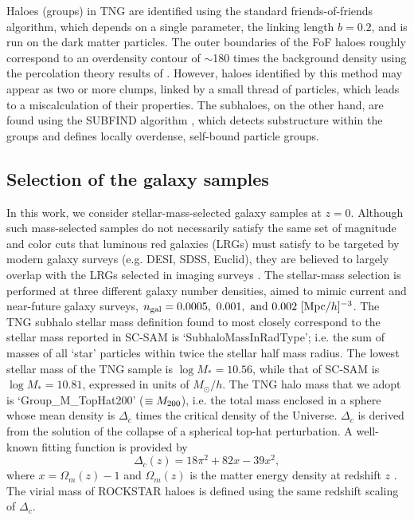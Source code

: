 \documentclass[fleqn,usenatbib]{mnras}
\begin{document}
Haloes (groups) in TNG are identified using the standard friends-of-friends \citep[FoF,][]{1985ApJ...292..371D,1987ApJ...319..575B} algorithm, which depends on a single parameter, the linking length $b = 0.2$, and is run on the dark matter particles. The outer boundaries of the FoF haloes roughly correspond to an overdensity contour of $\sim$180 times the background density using the percolation theory results of \citet{2011ApJS..195....4M}. However, haloes identified by this method may appear as two or more clumps, linked by a small thread of particles, which leads to a miscalculation of their properties. The subhaloes, on the other hand, are found using the SUBFIND algorithm \citep{Springel:2000qu}, which detects substructure within the groups and defines locally overdense, self-bound particle groups.

\subsection{Selection of the galaxy samples}
\label{sec:sample}
In this work, we consider stellar-mass-selected galaxy samples at $z = 0$. Although such mass-selected samples do not necessarily satisfy the same set of magnitude and color cuts that luminous red galaxies (LRGs) must satisfy to be targeted by modern galaxy surveys (e.g. DESI, SDSS, Euclid), they are believed to largely overlap with the LRGs selected in imaging surveys \citep{2013MNRAS.433.3506M}. 
%
The stellar-mass selection is performed at three different galaxy number densities, aimed to mimic current and near-future galaxy surveys, $n_{\rm gal} = 0.0005, \ 0.001, \ {\rm and} \ 0.002 \ [{\rm Mpc}/h]^{-3}$. The TNG subhalo stellar mass definition found to most closely correspond to the stellar mass reported in SC-SAM is `SubhaloMassInRadType'; i.e. the sum of masses of all `star' particles within twice the stellar half mass radius. The lowest stellar mass of the TNG sample is $\log M_\ast = 10.56$, while that of SC-SAM is $\log M_\ast = 10.81$, expressed in units of $M_\odot/h$. The TNG halo mass that we adopt is `Group\_M\_TopHat200' ($\equiv M_{\rm 200}$), i.e. the total mass enclosed in a sphere whose mean density is $\Delta_c$ times the critical density of the Universe. $\Delta_c$ is derived from the solution of the collapse of a spherical top-hat perturbation. A well-known fitting function is provided by
\begin{equation}
  \Delta_c(z) = 18 \pi^2 + 82 x - 39 x^2,
\end{equation} 
where $x = \Omega_m(z) - 1$ and $\Omega_m(z)$ is the matter energy density at redshift $z$ \citep{1998ApJ...495...80B}. The virial mass of \textsc{ROCKSTAR} haloes is defined using the same redshift scaling of $\Delta_c$.
\end{document}
